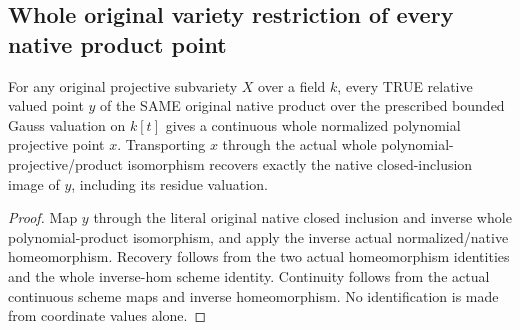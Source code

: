 \subsection{Whole original variety restriction of every native product point}

\begin{definition}
\label{local:actual-product-normalized-point}
\leanok
{}
For any original projective subvariety $X$ over a field $k$, every TRUE
relative valued point $y$ of the SAME original native product over the
prescribed bounded Gauss valuation on $k[t]$ gives a continuous whole
normalized polynomial projective point $x$. Transporting $x$ through the
actual whole polynomial-projective/product isomorphism recovers exactly
the native closed-inclusion image of $y$, including its residue valuation.
\end{definition}
\begin{proof}
Map $y$ through the literal original native closed inclusion and inverse
whole polynomial-product isomorphism, and apply the inverse actual
normalized/native homeomorphism. Recovery follows from the two actual
homeomorphism identities and the whole inverse-hom scheme identity.
Continuity follows from the actual continuous scheme maps and inverse
homeomorphism. No identification is made from coordinate values alone.
\end{proof}

